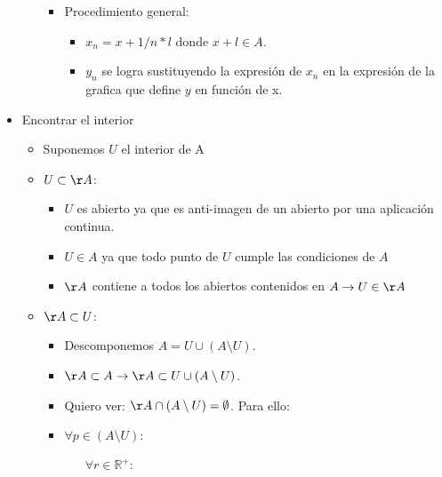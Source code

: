 \documentclass[twoside]{article}
\newcommand{\s}{\hspace{20pt}}
\begin{document}
\begin{itemize}
\begin{itemize}
\begin{itemize}
\item Procedimiento general:

\begin{itemize}

\item $x_n = x + 1/n*l$ donde $x+l \in A$.

\item $y_n$ se logra sustituyendo la expresión de $x_n$ en la expresión de la grafica que define $y$ en función de x.

\end{itemize}
\end{itemize}
\end{itemize}

\item Encontrar el interior

\begin{itemize}

\item Suponemos $U$ el interior de A

\item $U \subset \AA$:

\begin{itemize}

\item $U$ es abierto ya que es anti-imagen de un abierto por una aplicación continua.

\item $U \in A$ ya que todo punto de $U$ cumple las condiciones de $A$

\item $\AA$ contiene a todos los abiertos contenidos en $A \rightarrow U \in \AA$

\end{itemize}

\item $\AA \subset U$:

\begin{itemize}

\item Descomponemos $A = U \cup (A \setminus U)$.

\item $\AA \subset A \rightarrow \AA \subset U \cup (A \setminus U)$.

\item Quiero ver: $\AA \cap (A \setminus U) = \emptyset$. Para ello:

\item $\forall p \in (A \setminus U):$

$\s \forall r \in \mathbb{R^+}$:


\end{itemize}
\end{itemize}
\end{itemize}
\end{document}
